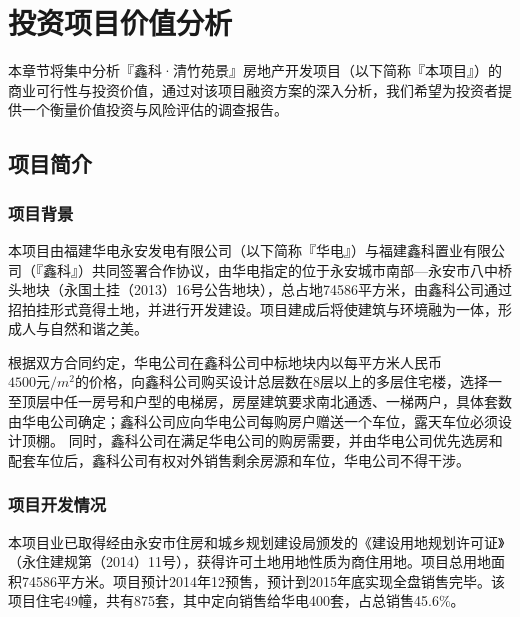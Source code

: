 
\chapter{投资项目价值分析}
\label{chap03}

本章节将集中分析『鑫科·清竹苑景』房地产开发项目（以下简称『本项目』）的商业可行性与投资价值，通过对该项目融资方案的深入分析，我们希望为投资者提供一个衡量价值投资与风险评估的调查报告。

\section{项目简介}
\subsection{项目背景}
本项目由福建华电永安发电有限公司（以下简称『华电』）与福建鑫科置业有限公司（『鑫科』）共同签署合作协议，由华电指定的位于永安城市南部—永安市八中桥头地块（永国土挂（2013）16号公告地块），总占地74586平方米，由鑫科公司通过招拍挂形式竟得土地，并进行开发建设。项目建成后将使建筑与环境融为一体，形成人与自然和谐之美。

根据双方合同约定，华电公司在鑫科公司中标地块内以每平方米人民币 $4 500 \mbox{元}/ m^2$的价格，向鑫科公司购买设计总层数在8层以上的多层住宅楼，选择一至顶层中任一房号和户型的电梯房，房屋建筑要求南北通透、一梯两户，具体套数由华电公司确定；鑫科公司应向华电公司每购房户赠送一个车位，露天车位必须设计顶棚。
同时，鑫科公司在满足华电公司的购房需要，并由华电公司优先选房和配套车位后，鑫科公司有权对外销售剩余房源和车位，华电公司不得干涉。
\subsection{项目开发情况}
本项目业已取得经由永安市住房和城乡规划建设局颁发的《建设用地规划许可证》（永住建规第（2014）11号），获得许可土地用地性质为商住用地。项目总用地面积74586平方米。项目预计2014年12预售，预计到2015年底实现全盘销售完毕。该项目住宅49幢，共有875套，其中定向销售给华电400套，占总销售45.6\%。

